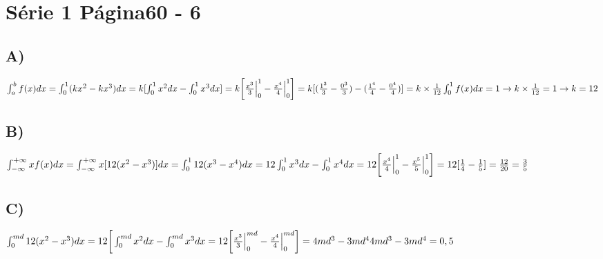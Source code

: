 \section*{Série 1 Página60  - 6}
    
    \subsection*{A)}
    $\int_{a}^{b}f(x)dx = \int_{0}^{1}(kx^2 - kx^3)dx = k [\int_{0}^{1}x^2dx - \int_{0}^{1}x^3dx] = k \bigg[\frac{x^3}{3}\Big|^1_0 - \frac{x^4}{4}\Big|^1_0\bigg] = k [(\frac{1^3}{3} - \frac{0^3}{3}) - (\frac{1^4}{4} - \frac{0^4}{4})] = k \times \frac{1}{12}\\
    \int_{0}^{1}f(x)dx = 1 \rightarrow k \times \frac{1}{12} = 1 \rightarrow k = 12$
    
    \subsection*{B)}
    $\int_{-\infty}^{+\infty}xf(x)dx = \int_{-\infty}^{+\infty}x[12(x^2 - x^3)]dx = \int_{0}^{1}12(x^3 - x^4)dx = 12\int_{0}^{1}x^3dx - \int_{0}^{1}x^4dx = \\
    12 \bigg[\frac{x^4}{4}\Big|^1_0 - \frac{x^5}{5}\Big|^1_0\bigg] = 12 [\frac{1}{4} - \frac{1}{5}] = \frac{12}{20} = \frac{3}{5}$
    
    
    \subsection*{C)}
    $\int_{0}^{md}12(x^2 - x^3)dx = 12 \bigg[\int_{0}^{md}x^2dx - \int_{0}^{md}x^3dx = 12\bigg[\frac{x^3}{3}\Big|^{md}_0 - \frac{x^4}{4}\Big|^{md}_0\bigg] = 4md^3 - 3md^4\\
    4md^3 - 3md^4 = 0,5$ 
    
